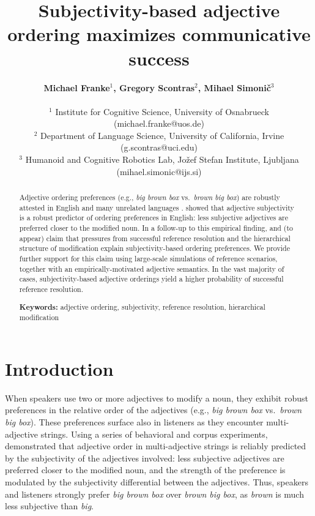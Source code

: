 \documentclass[10pt,a4paper]{article}
\title{Subjectivity-based adjective ordering maximizes communicative success}
\author{\large \textbf{Michael Franke$^1$, Gregory Scontras$^2$, Mihael Simoni\v{c}$^3$}\\
  \gcs{are we okay with an alphabetical author listing?} \mf{okay, but we should
    submit anonymously this year} \\
  $^1$ Institute for Cognitive Science, University of Osnabrueck (michael.franke@uos.de)\\
  $^2$ Department of Language Science, University of California, Irvine (g.scontras@uci.edu)\\
  $^3$ Humanoid and Cognitive Robotics Lab, Jo\v{z}ef Stefan Institute,
  Ljubljana (mihael.simonic@ijs.si)}
\begin{document}
\maketitle

\begin{abstract}
Adjective ordering preferences (e.g., \emph{big brown box} vs.~\emph{brown big box}) are robustly attested in English and many unrelated languages \cite{dixon1982}.  showed that adjective subjectivity is a robust predictor of ordering preferences in English: less subjective adjectives are preferred closer to the modified noun. In a follow-up to this empirical finding,  and \citeauthor{scontrasetalSPadjectives} (to appear) claim that pressures from successful reference resolution and the hierarchical structure of modification explain subjectivity-based ordering preferences. We provide further support for this claim using large-scale simulations of reference scenarios, together with an empirically-motivated adjective semantics. In the vast majority of cases, subjectivity-based adjective orderings yield a higher probability of successful reference resolution.


\textbf{Keywords:} 
adjective ordering, subjectivity, reference resolution, hierarchical modification

\end{abstract}

\section{Introduction}

When speakers use two or more adjectives to modify a noun, they exhibit robust preferences in the relative order of the adjectives (e.g., \emph{big brown box} vs.~\emph{brown big box}). These preferences surface also in listeners as they encounter multi-adjective strings. Using a series of behavioral and corpus experiments,  demonstrated that adjective order in multi-adjective strings is reliably predicted by the subjectivity of the adjectives involved: less subjective adjectives are preferred closer to the modified noun, and the strength of the preference is modulated by the subjectivity differential between the adjectives. Thus, speakers and listeners strongly prefer \emph{big brown box} over \emph{brown big box}, as \emph{brown} is much less subjective than \emph{big}.
\end{document}
